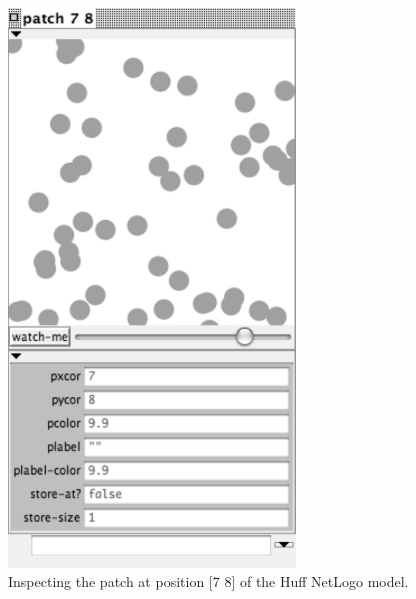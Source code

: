 \begin{figure}[htbp] %
   \centering
   \includegraphics[width=3in]{figures/HuffInspectPatch_7_8.pdf}  
   \caption{Inspecting the patch at position [7 8] of the Huff NetLogo model.} %
   \label{fig:Huff:inspecting_patch_7_8}
\end{figure}



